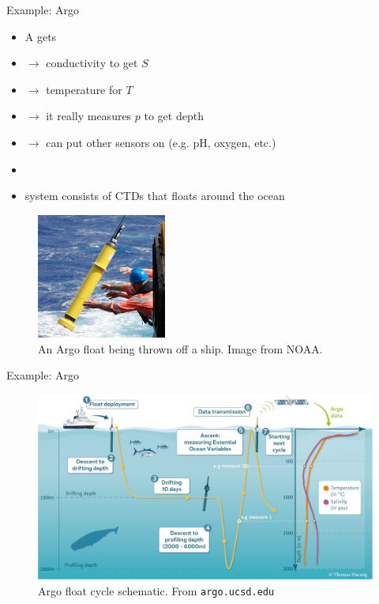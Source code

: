 \documentclass[xcolor=x11names,compress]{beamer}
\renewcommand{\(}{\begin{columns}}
\renewcommand{\)}{\end{columns}}
\newcommand{\<}[1]{\begin{column}{#1}}
\renewcommand{\>}{\end{column}}
\begin{document}
\begin{frame}{Example: Argo}

\parbox{0.55\textwidth}{
\begin{itemize}
  \item A  gets
  \item[] $\to$ conductivity to get $S$
  \item[] $\to$ temperature for $T$
  \item[] $\to$ it really measures $p$ to get depth
  \item[] $\to$ can put other sensors on (e.g. pH, oxygen, etc.)
  \item[]
  \item {} system consists of CTDs that floats around the ocean
\end{itemize}
}\hspace*{3mm}\parbox{0.38\textwidth}{
\begin{figure}
  \includegraphics[width=0.38\textwidth]{argo_float}
  \caption{An Argo float being thrown off a ship. Image from NOAA.}
\end{figure}
}

\end{frame}


\begin{frame}{Example: Argo}

\begin{figure}
  \includegraphics[width=\textwidth]{float_cycle_1}
  \caption{Argo float cycle schematic. From \texttt{argo.ucsd.edu}}
\end{figure}

\end{frame}
\end{document}

